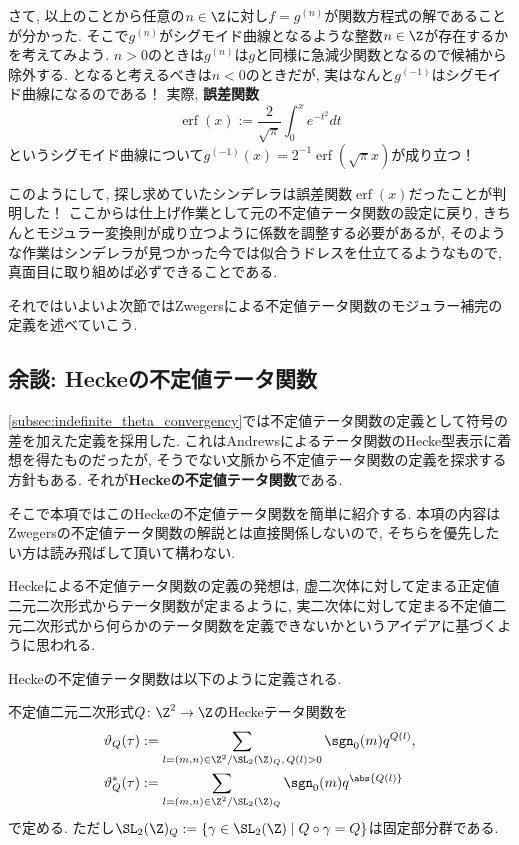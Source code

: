 \documentclass[11pt,b5paper,oneside,lualatex]{ltjsarticle} %
\DeclareMathOperator{\erf}{erf}
\numberwithin{equation}{section} %
\begin{document}
さて, 以上のことから任意の$ n \in \Z $に対し$ f = g^{(n)} $が関数方程式の解であることが分かった. 
そこで$ g^{(n)} $がシグモイド曲線となるような整数$ n \in \Z $が存在するかを考えてみよう. 
$ n>0 $のときは$ g^{(n)} $は$ g $と同様に急減少関数となるので候補から除外する. 
となると考えるべきは$ n < 0 $のときだが, 実はなんと$ g^{(-1)} $はシグモイド曲線になるのである！
実際, \textbf{誤差関数}
\[
\erf(x) := \frac{2}{\sqrt{\pi}} \int_{0}^{x} e^{-t^2} dt
\]
というシグモイド曲線について$ g^{(-1)} (x) = 2^{-1} \erf(\sqrt{\pi} x) $が成り立つ！

このようにして, 探し求めていたシンデレラは誤差関数$ \erf(x) $だったことが判明した！
ここからは仕上げ作業として元の不定値テータ関数の設定に戻り, きちんとモジュラー変換則が成り立つように係数を調整する必要があるが, そのような作業はシンデレラが見つかった今では似合うドレスを仕立てるようなもので, 真面目に取り組めば必ずできることである. 

それではいよいよ次節ではZwegersによる不定値テータ関数のモジュラー補完の定義を述べていこう. 




\subsection{余談: Heckeの不定値テータ関数} \label{subsec:Hecke_theta}


\cref{subsec:indefinite_theta_convergency}では不定値テータ関数の定義として符号の差を加えた定義を採用した. 
これはAndrewsによるテータ関数のHecke型表示に着想を得たものだったが, そうでない文脈から不定値テータ関数の定義を探求する方針もある. 
それが\textbf{Heckeの不定値テータ関数}である. 

そこで本項ではこのHeckeの不定値テータ関数を簡単に紹介する. 
本項の内容はZwegersの不定値テータ関数の解説とは直接関係しないので, そちらを優先したい方は読み飛ばして頂いて構わない. 

Heckeによる不定値テータ関数の定義の発想は, 虚二次体に対して定まる正定値二元二次形式からテータ関数が定まるように, 実二次体に対して定まる不定値二元二次形式から何らかのテータ関数を定義できないかというアイデアに基づくように思われる. 

Heckeの不定値テータ関数は以下のように定義される. 

\begin{dfn}
	不定値二元二次形式$ Q \colon \Z^2 \to \Z $のHeckeテータ関数を
	\begin{align}
		\vartheta_Q (\tau) 
		&:=
		\sum_{l = (m, n) \in \Z^2 / \SL_2(\Z)_Q, \, Q(l) > 0} \sgn_0(m) q^{Q(l)}, 
		\\
		\vartheta_Q^* (\tau)
		&:=
		\sum_{l = (m, n) \in \Z^2 / \SL_2(\Z)_Q} \sgn_0(m) q^{\abs{Q(l)}}
	\end{align}
	で定める. 
	ただし$ \SL_2(\Z)_Q := \{ \gamma \in \SL_2(\Z) \mid Q \circ \gamma = Q \} $は固定部分群である. 
\end{dfn}
\end{document}

